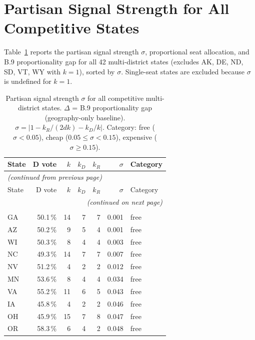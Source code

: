 \appendix

\section{Partisan Signal Strength for All Competitive States}
\label{appendix:sigma}

Table~\ref{tab:sigma-full} reports the partisan signal strength $\sigma$,
proportional seat allocation, and B.9 proportionality gap for all 42
multi-district states (excludes AK, DE, ND, SD, VT, WY with $k=1$), sorted
by $\sigma$.
Single-seat states are excluded because $\sigma$ is undefined for $k=1$.

\begin{longtable}{lrrrrrl}
\caption{Partisan signal strength $\sigma$ for all competitive multi-district
  states. $\Delta$ = B.9 proportionality gap (geography-only baseline).
  $\sigma = |1 - k_R/(2dk) - k_D/k|$. Category: free ($\sigma < 0.05$),
  cheap ($0.05 \leq \sigma < 0.15$), expensive ($\sigma \geq 0.15$).}
\label{tab:sigma-full} \\
\toprule
State & D vote & $k$ & $k_D$ & $k_R$ & $\sigma$ & Category \\
\midrule
\endfirsthead
\multicolumn{7}{l}{\emph{(continued from previous page)}} \\
\toprule
State & D vote & $k$ & $k_D$ & $k_R$ & $\sigma$ & Category \\
\midrule
\endhead
\midrule
\multicolumn{7}{r}{\emph{(continued on next page)}} \\
\endfoot
\bottomrule
\endlastfoot
\multicolumn{7}{l}{\textit{Free proportionality ($\sigma < 0.05$) --- 19 states}} \\
GA & 50.1\,\% & 14 &  7 &  7 & 0.001 & free \\
AZ & 50.2\,\% &  9 &  5 &  4 & 0.001 & free \\
WI & 50.3\,\% &  8 &  4 &  4 & 0.003 & free \\
NC & 49.3\,\% & 14 &  7 &  7 & 0.007 & free \\
NV & 51.2\,\% &  4 &  2 &  2 & 0.012 & free \\
MN & 53.6\,\% &  8 &  4 &  4 & 0.034 & free \\
VA & 55.2\,\% & 11 &  6 &  5 & 0.043 & free \\
IA & 45.8\,\% &  4 &  2 &  2 & 0.046 & free \\
OH & 45.9\,\% & 15 &  7 &  8 & 0.047 & free \\
OR & 58.3\,\% &  6 &  4 &  2 & 0.048 & free \\

\end{longtable}
